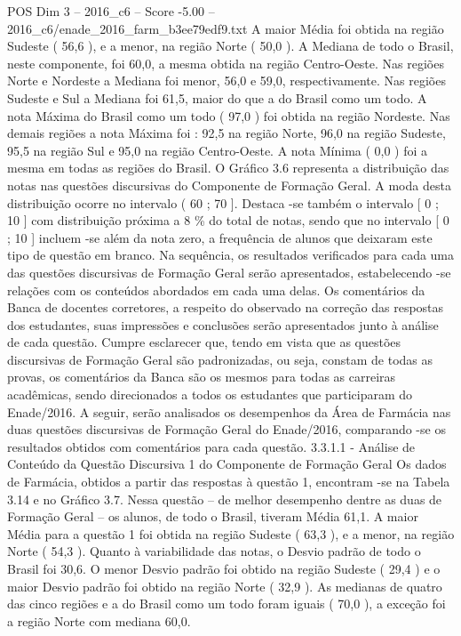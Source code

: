 \begin{textsample}{POS Dim 3 – 2016\_c6 – Score -5.00 – 2016\_c6/enade\_2016\_farm\_b3ee79edf9.txt}
A maior Média foi obtida na região Sudeste ( 56,6 ), e a menor, na região Norte ( 50,0 ).
A Mediana de todo o Brasil, neste componente, foi 60,0, a mesma obtida na região Centro-Oeste.
Nas regiões Norte e Nordeste a Mediana foi menor, 56,0 e 59,0, respectivamente.
Nas regiões Sudeste e Sul a Mediana foi 61,5, maior do que a do Brasil como um todo.
A nota Máxima do Brasil como um todo ( 97,0 ) foi obtida na região Nordeste.
Nas demais regiões a nota Máxima foi : 92,5 na região Norte, 96,0 na região Sudeste, 95,5 na região Sul e 95,0 na região Centro-Oeste.
A nota Mínima ( 0,0 ) foi a mesma em todas as regiões do Brasil.
O Gráfico 3.6 representa a distribuição das notas nas questões discursivas do Componente de Formação Geral.
A moda desta distribuição ocorre no intervalo ( 60 ; 70 ].
Destaca -se também o intervalo [ 0 ; 10 ] com distribuição próxima a 8 \% do total de notas, sendo que no intervalo [ 0 ; 10 ] incluem -se além da nota zero, a frequência de alunos que deixaram este tipo de questão em branco.
Na sequência, os resultados verificados para cada uma das questões discursivas de Formação Geral serão apresentados, estabelecendo -se relações com os conteúdos abordados em cada uma delas.
Os comentários da Banca de docentes corretores, a respeito do observado na correção das respostas dos estudantes, suas impressões e conclusões serão apresentados junto à análise de cada questão.
Cumpre esclarecer que, tendo em vista que as questões discursivas de Formação Geral são padronizadas, ou seja, constam de todas as provas, os comentários da Banca são os mesmos para todas as carreiras acadêmicas, sendo direcionados a todos os estudantes que participaram do Enade/2016.
A seguir, serão analisados os desempenhos da Área de Farmácia nas duas questões discursivas de Formação Geral do Enade/2016, comparando -se os resultados obtidos com comentários para cada questão. 3.3.1.1 - Análise de Conteúdo da Questão Discursiva 1 do Componente de Formação Geral Os dados de Farmácia, obtidos a partir das respostas à questão 1, encontram -se na Tabela 3.14 e no Gráfico 3.7.
Nessa questão – de melhor desempenho dentre as duas de Formação Geral – os alunos, de todo o Brasil, tiveram Média 61,1.
A maior Média para a questão 1 foi obtida na região Sudeste ( 63,3 ), e a menor, na região Norte ( 54,3 ).
Quanto à variabilidade das notas, o Desvio padrão de todo o Brasil foi 30,6.
O menor Desvio padrão foi obtido na região Sudeste ( 29,4 ) e o maior Desvio padrão foi obtido na região Norte ( 32,9 ).
As medianas de quatro das cinco regiões e a do Brasil como um todo foram iguais ( 70,0 ), a exceção foi a região Norte com mediana 60,0.

\end{textsample}
